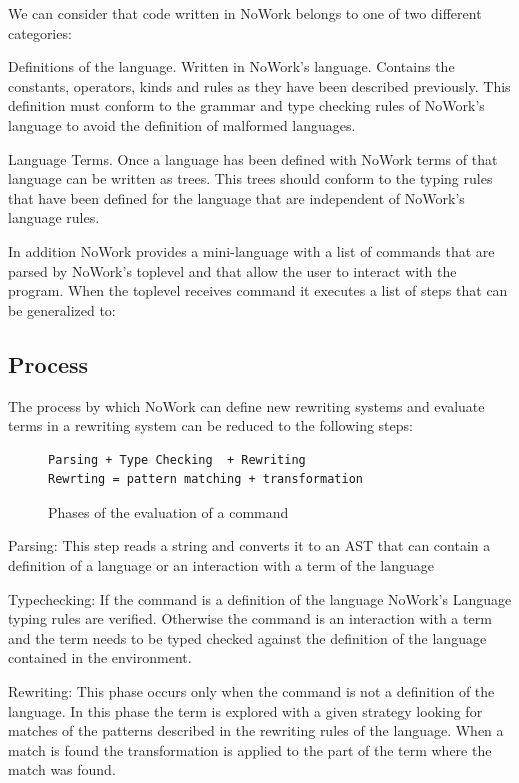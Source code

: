 \documentclass[12pt,a4paper]{article}
\begin{document}
We can consider that code written in NoWork belongs to one of two
different categories:

Definitions of the language. Written in NoWork's language. Contains the
constants, operators, kinds and rules as they have been described
previously. This definition must conform to the grammar and type
checking rules of NoWork's language to avoid the definition of
malformed languages.

Language Terms. Once a language has been defined with NoWork terms of
that language can be written as trees. This trees should conform to the
typing rules that have been defined for the language that are
independent of NoWork's language rules.

In addition NoWork provides a mini-language with a list of commands that are parsed by
NoWork's toplevel and that allow the user to interact with the
program. When the toplevel receives command it executes a list of
steps that can be generalized to:

\subsection{Process}

The process by which NoWork can define new rewriting systems and
evaluate terms in a rewriting system can be reduced to the following steps:

\begin{figure}[!h]
\begin{verbatim}
Parsing + Type Checking  + Rewriting
Rewrting = pattern matching + transformation
\end{verbatim}
\caption{ Phases of the evaluation of a command }
\end{figure}

Parsing: This step reads a string and converts it to an AST that
can contain a definition of a language or an interaction with a term
of the language

Typechecking: If the command is a definition of the language NoWork's
Language typing rules are verified. Otherwise the command is an interaction with a
term and the term needs to be typed checked against the definition of
the language contained in the environment.

Rewriting: This phase occurs only when the command is not a definition
of the language. In this phase the term is explored with a
given strategy looking for matches of the patterns described in the
rewriting rules of the language. When a match is found the
transformation is applied to the part of the term where the match
was found.
\end{document}
